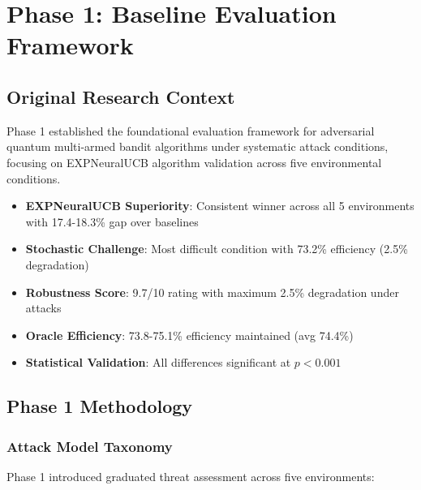 \documentclass[11pt,a4paper]{article}
\newcommand{\performance}[1]{\textcolor{performancecolor}{\textbf{#1}}}
\newcommand{\stochastic}[1]{\textcolor{stochasticcolor}{\textbf{#1}}}
\newcommand{\critical}[1]{\textcolor{criticalcolor}{\textbf{#1}}}
\newcommand{\success}[1]{\textcolor{successcolor}{\textbf{#1}}}
\begin{document}

\section{Phase 1: Baseline Evaluation Framework}

\subsection{Original Research Context}

Phase 1 established the foundational evaluation framework for adversarial quantum multi-armed bandit algorithms under systematic attack conditions, focusing on EXPNeuralUCB algorithm validation across five environmental conditions.

\begin{tcolorbox}[colback=performancecolor!10,colframe=performancecolor,title=\textbf{Phase 1 Key Results Summary}]
\begin{itemize}
\item \performance{EXPNeuralUCB Superiority}: Consistent winner across all 5 environments with 17.4-18.3\% gap over baselines
\item \stochastic{Stochastic Challenge}: Most difficult condition with 73.2\% efficiency (2.5\% degradation)
\item \success{Robustness Score}: 9.7/10 rating with maximum 2.5\% degradation under attacks
\item \performance{Oracle Efficiency}: 73.8-75.1\% efficiency maintained (avg 74.4\%)
\item \critical{Statistical Validation}: All differences significant at $p < 0.001$
\end{itemize}
\end{tcolorbox}

\subsection{Phase 1 Methodology}

\subsubsection{Attack Model Taxonomy}

Phase 1 introduced graduated threat assessment across five environments:
\end{document}
